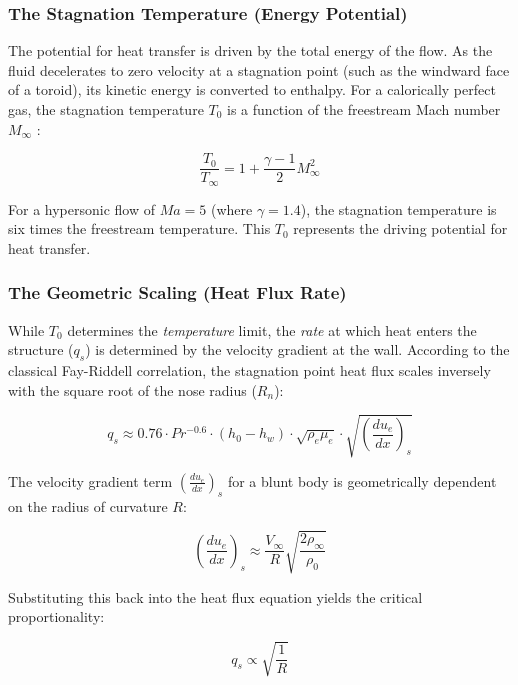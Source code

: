 \subsubsection*{The Stagnation Temperature (Energy Potential)}
The potential for heat transfer is driven by the total energy of the flow. As the fluid decelerates to zero velocity at a stagnation point (such as the windward face of a toroid), its kinetic energy is converted to enthalpy. For a calorically perfect gas, the stagnation temperature $T_0$ is a function of the freestream Mach number $M_{\infty}$ \cite{AndersonHypersonic}:

\begin{equation}
    \frac{T_0}{T_{\infty}} = 1 + \frac{\gamma - 1}{2} M_{\infty}^2
\end{equation}

For a hypersonic flow of $Ma=5$ (where $\gamma=1.4$), the stagnation temperature is six times the freestream temperature. This $T_0$ represents the driving potential for heat transfer.

\subsubsection*{The Geometric Scaling (Heat Flux Rate)}
While $T_0$ determines the \textit{temperature} limit, the \textit{rate} at which heat enters the structure ($q_s$) is determined by the velocity gradient at the wall. According to the classical Fay-Riddell correlation, the stagnation point heat flux scales inversely with the square root of the nose radius ($R_n$):

\begin{equation}
    q_s \approx 0.76 \cdot Pr^{-0.6} \cdot (h_{0} - h_w) \cdot \sqrt{\rho_e \mu_e} \cdot \sqrt{\left( \frac{du_e}{dx} \right)_s}
\end{equation}

The velocity gradient term $\left( \frac{du_e}{dx} \right)_s$ for a blunt body is geometrically dependent on the radius of curvature $R$:

\begin{equation}
    \left( \frac{du_e}{dx} \right)_s \approx \frac{V_{\infty}}{R} \sqrt{\frac{2 \rho_{\infty}}{\rho_{0}}}
\end{equation}

Substituting this back into the heat flux equation yields the critical proportionality:

\begin{equation}
    q_s \propto \sqrt{\frac{1}{R}}
\end{equation}

